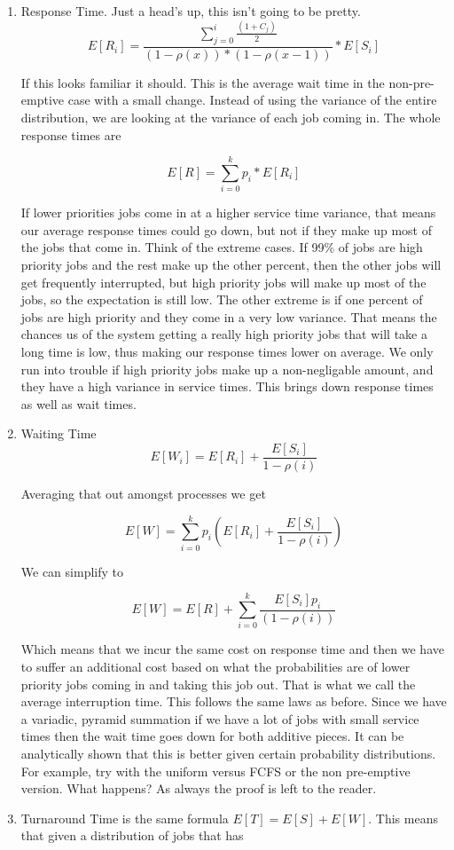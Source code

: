 \begin{enumerate}
\item Response Time. Just a head's up, this isn't going to be pretty.
  \[
  E[R_i] = \frac{\sum\limits_{j=0}^i\frac{(1 + C_j)}{2}}{(1 - \rho(x))*( 1 - \rho(x-1))} * E[S_i]
  \]

  If this looks familiar it should.
  This is the average wait time in the non-pre-emptive case with a small change. Instead of using the variance of the entire distribution, we are looking at the variance of each job coming in.
  The whole response times are

  \[
     E[R] = \sum\limits_{i = 0}^k p_i * E[R_i]
  \]

  If lower priorities jobs come in at a higher service time variance, that means our average response times could go down, but not if they make up most of the jobs that come in.
  Think of the extreme cases.
  If 99\% of jobs are high priority jobs and the rest make up the other percent, then the other jobs will get frequently interrupted, but high priority jobs will make up most of the jobs, so the expectation is still low.
  The other extreme is if one percent of jobs are high priority and they come in a very low variance.
  That means the chances us of the system getting a really high priority jobs that will take a long time is low, thus making our response times lower on average.
  We only run into trouble if high priority jobs make up a non-negligable amount, and they have a high variance in service times.
  This brings down response times as well as wait times.

\item Waiting Time
  \[
  E[W_i] = E[R_i] + \frac{E[S_i]}{1 - \rho(i)}
  \]

  Averaging that out amongst processes we get

  \[
  E[W] = \sum\limits_{i = 0}^k p_i (E[R_i] + \frac{E[S_i]}{1 - \rho(i)})
  \]

  We can simplify to

  \[
  E[W] = E[R] + \sum\limits_{i=0}^k \frac{E[S_i]p_i}{(1 - \rho(i))}
  \]

  Which means that we incur the same cost on response time and then we have to suffer an additional cost based on what the probabilities are of lower priority jobs coming in and taking this job out.
  That is what we call the average interruption time.
  This follows the same laws as before.
  Since we have a variadic, pyramid summation if we have a lot of jobs with small service times then the wait time goes down for both additive pieces.
  It can be analytically shown that this is better given certain probability distributions.
  For example, try with the uniform versus FCFS or the non pre-emptive version.
  What happens?
  As always the proof is left to the reader.

\item Turnaround Time is the same formula $E[T] = E[S] + E[W]$. This means that given a distribution of jobs that has
\end{enumerate}


